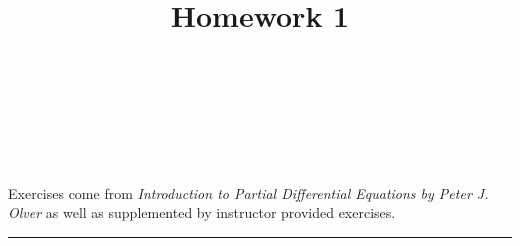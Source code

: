\documentclass[10pt]{amsart}
\theoremstyle{nonumberplain}
\begin{document}
\pagestyle{empty}

\newcommand{\mline}{\vspace{.2in}\hrule\vspace{.2in}}

\noindent
{} \\
 \\
 \\
 \\

\title{\bf {Homework 1} }


\maketitle
\noindent
Exercises come from \textit{Introduction to Partial Differential Equations by Peter J. Olver} as well as supplemented by instructor provided exercises.
\mline
\end{document}
